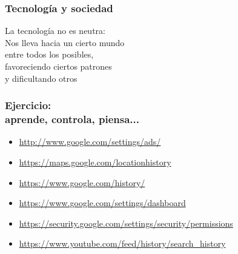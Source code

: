 \documentclass[17pt,aspectratio=169]{beamer}
\renewcommand{\secimage}{figs/bookpages}
\newcommand{\secimage}{figs/bookpages}
\begin{document}

\begin{frame}
\frametitle{Tecnología y sociedad}

{\Large
La tecnología no es neutra: \\
Nos lleva hacia un cierto mundo \\
entre todos los posibles, \\
favoreciendo ciertos patrones \\
y dificultando otros \\
}

\end{frame}




\begin{frame}
\frametitle{Ejercicio: \\ aprende, controla, piensa...}


{\small
\begin{itemize}
  \item \url{http://www.google.com/settings/ads/}
  \item \url{https://maps.google.com/locationhistory}
  \item \url{https://www.google.com/history/}
  \item \url{https://www.google.com/settings/dashboard}
  \item \url{https://security.google.com/settings/security/permissions}
  \item \url{https://www.youtube.com/feed/history/search_history}
  \end{itemize}
}
\end{frame}
\end{document}
